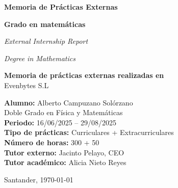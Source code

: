 \begin{titlepage}
\begin{center}
{\Huge \textbf{Memoria de Prácticas Externas}}

\vspace{0.5cm}

{\Huge \textbf{Grado en matemáticas}}

\vspace{0.5cm}

{\Large \textit{External Internship Report}}

\vspace{0.5cm}

{\Large \textit{Degree in Mathematics}}

\vspace{0.5cm}

\vspace{1cm}

\textbf{Memoria de prácticas externas realizadas en}\\[0.5cm]
{\large Evenbytes S.L}

\vfill

\textbf{Alumno:} Alberto Campuzano Solórzano \\
Doble Grado en Física y Matemáticas \\[0.3cm]
\textbf{Periodo:} 16/06/2025 – 29/08/2025 \\
\textbf{Tipo de prácticas:} Curriculares + Extracurriculares \\
\textbf{Número de horas:} 300 + 50 \\[0.5cm]
\textbf{Tutor externo:} Jacinto Pelayo, CEO \\
\textbf{Tutor académico:} Alicia Nieto Reyes

\vspace{1cm}

Santander, \today

\end{center}
\end{titlepage}